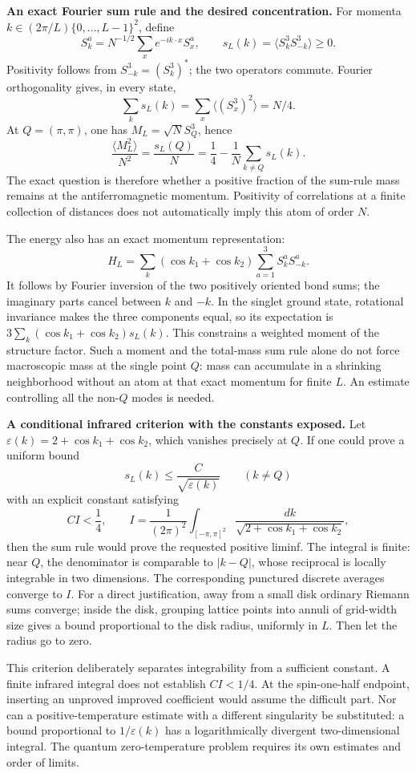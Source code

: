 \documentclass[11pt]{article}
\begin{document}
\textbf{An exact Fourier sum rule and the desired concentration.}
For momenta $k\in(2\pi/L)\{0,\ldots,L-1\}^2$, define
\[
 S_k^a=N^{-1/2}\sum_xe^{-ik\cdot x}S_x^a,
 \qquad s_L(k)=\langle S_k^3 S_{-k}^3\rangle\geq0.
\]
Positivity follows from $S_{-k}^3=(S_k^3)^*$; the two operators commute.
Fourier orthogonality gives, in every state,
\[
 \sum_k s_L(k)=\sum_x\langle(S_x^3)^2\rangle=N/4.
\]
At $Q=(\pi,\pi)$, one has $M_L=\sqrt N S_Q^3$, hence
\[
 \frac{\langle M_L^2\rangle}{N^2}=
 \frac{s_L(Q)}{N}=\frac14-\frac1N\sum_{k\ne Q}s_L(k).
\]
The exact question is therefore whether a positive fraction of the sum-rule
mass remains at the antiferromagnetic momentum.  Positivity of correlations
at a finite collection of distances does not automatically imply this atom
of order $N$.

The energy also has an exact momentum representation:
\[
 H_L=\sum_k(\cos k_1+\cos k_2)
                    \sum_{a=1}^3 S_k^aS_{-k}^a.
\]
It follows by Fourier inversion of the two positively oriented bond sums;
the imaginary parts cancel between $k$ and $-k$.  In the singlet ground state,
rotational invariance makes the three components equal, so its expectation is
$3\sum_k(\cos k_1+\cos k_2)s_L(k)$.
This constrains a weighted moment of the structure factor.  Such a moment
and the total-mass sum rule alone do not force macroscopic mass at the single
point $Q$: mass can accumulate in a shrinking neighborhood without an atom
at that exact momentum for finite $L$.  An estimate controlling all the
non-$Q$ modes is needed.

\textbf{A conditional infrared criterion with the constants exposed.}
Let $\varepsilon(k)=2+\cos k_1+\cos k_2$, which vanishes precisely at $Q$.
If one could prove a uniform bound
\[
 s_L(k)\leq\frac{C}{\sqrt{\varepsilon(k)}}\qquad(k\ne Q)
\]
with an explicit constant satisfying
\[
 C I<\frac14,\qquad
 I=\frac1{(2\pi)^2}\int_{[-\pi,\pi]^2}
                \frac{dk}{\sqrt{2+\cos k_1+\cos k_2}},
\]
then the sum rule would prove the requested positive liminf.
The integral is finite: near $Q$, the denominator is comparable to
$|k-Q|$, whose reciprocal is locally integrable in two dimensions.
The corresponding punctured discrete averages converge to $I$.  For a
direct justification, away from a small disk ordinary Riemann sums converge;
inside the disk, grouping lattice points into annuli of grid-width size gives
a bound proportional to the disk radius, uniformly in $L$.  Then let the
radius go to zero.

This criterion deliberately separates integrability from a sufficient
constant.  A finite infrared integral does not establish $CI<1/4$.
At the spin-one-half endpoint, inserting an unproved improved coefficient
would assume the difficult part.  Nor can a positive-temperature estimate
with a different singularity be substituted: a bound proportional to
$1/\varepsilon(k)$ has a logarithmically divergent two-dimensional integral.
The quantum zero-temperature problem requires its own estimates and order
of limits.
\end{document}
